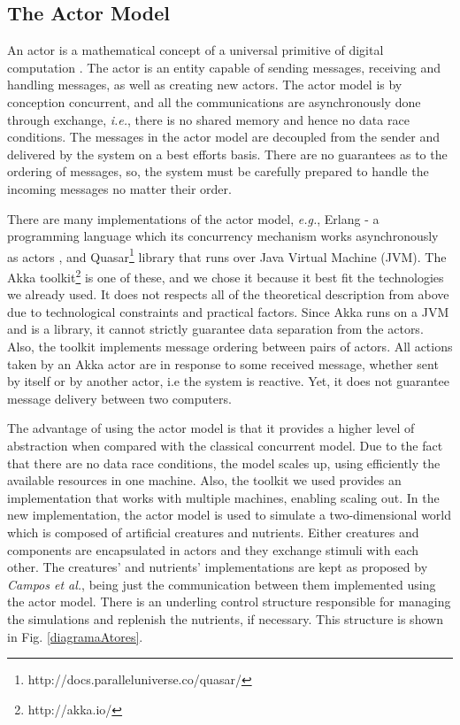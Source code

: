 \documentclass[runningheads]{llncs}
\begin{document}
\subsection{The Actor Model}
\label{subsec:actors}
An actor is a mathematical concept of a universal primitive of digital computation \cite{Hewitt2012}. The actor is an entity capable of sending messages, receiving and handling messages, as well as creating new actors. The actor model is by conception concurrent, and all the communications are asynchronously done through exchange, \textit{i.e.},  there is no shared memory and hence no data race conditions. The messages in the actor model are decoupled from the sender and delivered by the system on a best efforts basis\cite{Hewitt2014}. There are no guarantees as to the ordering of messages, so, the system must be carefully prepared to handle the incoming messages no matter their order.

There are many implementations of the actor model, \textit{e.g.}, Erlang - a programming language which its concurrency mechanism works  asynchronously as actors \cite{Armstrong2007}, and Quasar\footnote[1]{http://docs.paralleluniverse.co/quasar/} library that runs over Java Virtual Machine (JVM). The Akka toolkit\footnote[2]{http://akka.io/} is one of these, and we chose it because it best fit the technologies we already used. It does not respects all of the theoretical description from above due to technological constraints and practical factors. Since Akka runs on a JVM and is a library, it cannot strictly guarantee data separation from the actors. Also, the toolkit implements message ordering between pairs of actors. All actions taken by an Akka actor are in response to some received message, whether sent by itself or by another actor, i.e the system is reactive. Yet, it does not guarantee message delivery between two computers.

The advantage of using the actor model is that it provides a higher level of abstraction when compared with the classical concurrent model. Due to the fact that there are no data race conditions, the model scales up, using efficiently the available resources in one machine. Also, the toolkit we used provides an implementation that works with multiple machines, enabling scaling out. In the new implementation, the actor model is used to simulate a two-dimensional world which is composed of artificial creatures and nutrients. Either creatures and components are encapsulated in actors and they exchange stimuli with each other. The creatures' and nutrients' implementations are  kept as proposed by \textit{Campos et al.}\cite{Campos}, being just the communication between them implemented using the actor model. There is an underling control structure responsible for managing the simulations and replenish the nutrients, if necessary. This structure is shown in Fig. \ref{diagramaAtores}. 
\end{document}
